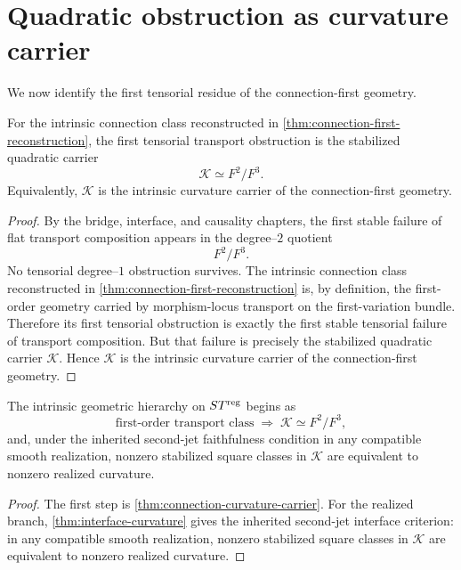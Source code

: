 \section{Quadratic obstruction as curvature carrier}
\label{sec:quadratic-obstruction-curvature}
We now identify the first tensorial residue of the connection-first
geometry.
\begin{theorem}
	\label{thm:connection-curvature-carrier}
	For the intrinsic connection class reconstructed in
	\cref{thm:connection-first-reconstruction}, the first tensorial
	transport obstruction is the stabilized quadratic carrier
	\[
		\mathcal K\simeq F^2/F^3.
	\]
	Equivalently, \(\mathcal K\) is the intrinsic curvature carrier of the
	connection-first geometry.
\end{theorem}
\begin{proof}
	By the bridge, interface, and causality chapters, the first stable
	failure of flat transport composition appears in the degree--\(2\)
	quotient
	\[
		F^2/F^3.
	\]
	No tensorial degree--\(1\) obstruction survives.
	The intrinsic connection class reconstructed in
	\cref{thm:connection-first-reconstruction} is, by definition, the
	first-order geometry carried by morphism-locus transport on the
	first-variation bundle.  Therefore its first tensorial obstruction is
	exactly the first stable tensorial failure of transport composition.
	But that failure is precisely the stabilized quadratic carrier
	\(\mathcal K\).
	Hence \(\mathcal K\) is the intrinsic curvature carrier of the
	connection-first geometry.
\end{proof}
\begin{corollary}
	The intrinsic geometric hierarchy on \(ST^{\mathrm{reg}}\) begins as
	\[
		\text{first-order transport class}
		\;\Longrightarrow\;
		\mathcal K\simeq F^2/F^3,
	\]
	and, under the inherited second-jet faithfulness condition in any
	compatible smooth realization, nonzero stabilized square classes in
	\(\mathcal K\) are equivalent to nonzero realized curvature.
\end{corollary}
\begin{proof}
	The first step is \cref{thm:connection-curvature-carrier}.  For the
	realized branch, \cref{thm:interface-curvature} gives the inherited
	second-jet interface criterion: in any compatible smooth realization,
	nonzero stabilized square classes in \(\mathcal K\) are equivalent to
	nonzero realized curvature.
\end{proof}
